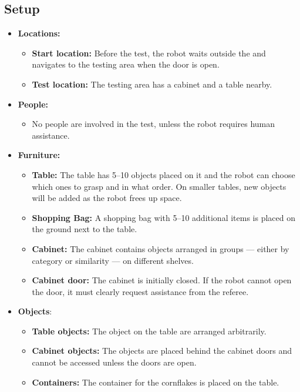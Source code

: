 \subsection*{Setup}
\begin{itemize}
	\item \textbf{Locations:}
		\begin{itemize}
			\item \textbf{Start location:} Before the test, the robot waits outside the \Arena{} and navigates to the testing area when the door is open.
			\item \textbf{Test location:} The testing area has a cabinet and a table nearby.
		\end{itemize}
	\item \textbf{People:}
		\begin{itemize}
			\item No people are involved in the test, unless the robot requires human assistance.
		\end{itemize}
	\item \textbf{Furniture:}
		\begin{itemize}
			\item \textbf{Table:} The table has 5--10 objects placed on it and the robot can choose which ones to grasp and in what order. On smaller tables, new objects will be added as the robot frees up space.
			\item \textbf{Shopping Bag:} A shopping bag with 5--10 additional items is placed on the ground next to the table.
			\item \textbf{Cabinet:} The cabinet contains objects arranged in groups --- either by category or similarity --- on different shelves.
			\item \textbf{Cabinet door:} The cabinet is initially closed. If the robot cannot open the door, it must clearly request assistance from the referee.
		\end{itemize}
	\item \textbf{Objects}:
		\begin{itemize}
			\item \textbf{Table objects:} The object on the table are arranged arbitrarily.
			\item \textbf{Cabinet objects:} The objects are placed behind the cabinet doors and cannot be accessed unless the doors are open.
			\item \textbf{Containers:} The container for the cornflakes is placed on the table.
		\end{itemize}
\end{itemize}


